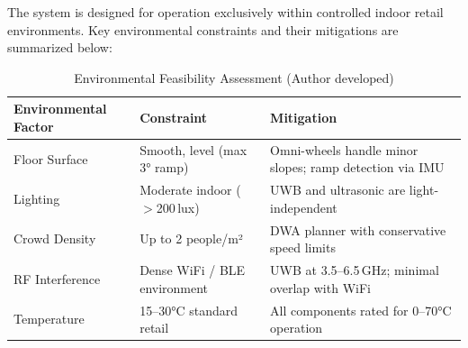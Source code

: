 The system is designed for operation exclusively within controlled indoor
retail environments. Key environmental constraints and their mitigations
are summarized below:

\begin{table}[!ht]
\caption{Environmental Feasibility Assessment (Author developed)}
\label{tab:envfeas}
\centering
\footnotesize
\begin{tabular}{p{1.8cm} p{2.0cm} p{2.8cm}}
\toprule
\textbf{Environmental Factor} & \textbf{Constraint} & \textbf{Mitigation} \\
\midrule
Floor Surface & Smooth, level (max 3° ramp) & Omni-wheels handle minor slopes; ramp detection via IMU \\
Lighting & Moderate indoor ($>$200\,lux) & UWB and ultrasonic are light-independent \\
Crowd Density & Up to 2 people/m² & DWA planner with conservative speed limits \\
RF Interference & Dense WiFi / BLE environment & UWB at 3.5--6.5\,GHz; minimal overlap with WiFi \\
Temperature & 15--30°C standard retail & All components rated for 0--70°C operation \\
\bottomrule
\end{tabular}
\end{table}

